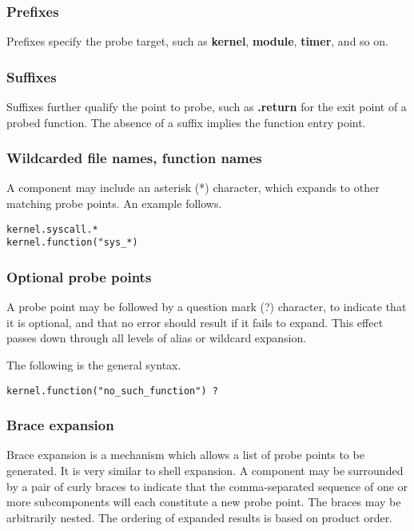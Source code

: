 \documentclass[twoside,english]{article}
\newenvironment{vindent}
{\begin{list}{}{\setlength{\listparindent}{6pt}}
\item[]}
{\end{list}}
\begin{document}
\subsubsection{Prefixes}
Prefixes specify the probe target, such as \textbf{kernel}, \textbf{module},
\textbf{timer}, and so on.

\subsubsection{Suffixes}
Suffixes further qualify the point to probe, such as \textbf{.return} for the
exit point of a probed function. The absence of a suffix implies the function
entry point.

\subsubsection{Wildcarded file names, function names}
A component may include an asterisk ({*}) character, which expands to other
matching probe points. An example follows.

\begin{vindent}
\begin{verbatim}
kernel.syscall.*
kernel.function("sys_*)
\end{verbatim}
\end{vindent}

\subsubsection{Optional probe points\label{sub:Optional-probe-points}}
A probe point may be followed by a question mark (?) character, to indicate
that it is optional, and that no error should result if it fails to expand.
This effect passes down through all levels of alias or wildcard expansion.

The following is the general syntax.

\begin{vindent}
\begin{verbatim}
kernel.function("no_such_function") ?
\end{verbatim}
\end{vindent}

\subsubsection{Brace expansion}
Brace expansion is a mechanism which allows a list of probe points to be
generated. It is very similar to shell expansion. A component may be surrounded
by a pair of curly braces to indicate that the comma-separated sequence of
one or more subcomponents will each constitute a new probe point. The braces
may be arbitrarily nested. The ordering of expanded results is based on
product order.
\end{document}
